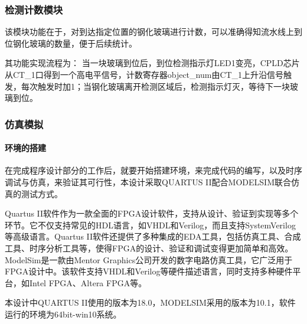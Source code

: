 \subsubsection{检测计数模块}

该模块功能在于，对到达指定位置的钢化玻璃进行计数，可以准确得知流水线上到位钢化玻璃的数量，便于后续统计。\par
其功能实现流程为：
当一块玻璃到位后，到位检测指示灯LED1变亮，CPLD芯片从CT\_1口得到一个高电平信号，计数寄存器object\_num由CT\_1上升沿信号触发，每次触发时加1；当钢化玻璃离开检测区域后，检测指示灯灭，等待下一块玻璃到位。\par
\subsubsection{仿真模拟}
\paragraph{环境的搭建}
在完成程序设计部分的工作后，就要开始搭建环境，来完成代码的编写，以及时序调试与仿真，来验证其可行性，本设计采取QUARTUS II配合MODELSIM联合仿真的测试方式。\par
Quartus II软件作为一款全面的FPGA设计软件，支持从设计、验证到实现等多个环节。它不仅支持常见的HDL语言，如VHDL和Verilog，而且支持SystemVerilog等高级语言。Quartus II软件还提供了多种集成的EDA工具，包括仿真工具、合成工具、时序分析工具等，使得FPGA的设计、验证和调试变得更加简单和高效。
ModelSim是一款由Mentor Graphics公司开发的数字电路仿真工具，它广泛用于FPGA设计中。该软件支持VHDL和Verilog等硬件描述语言，同时支持多种硬件平台，如Intel FPGA、Altera FPGA等。\par
本设计中QUARTUS II使用的版本为18.0，MODELSIM采用的版本为10.1，软件运行的环境为64bit-win10系统。\par
